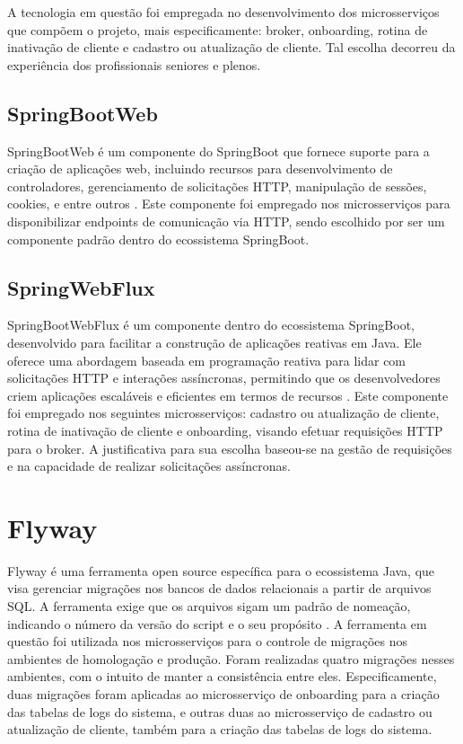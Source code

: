 A tecnologia em questão foi empregada no desenvolvimento dos microsserviços que compõem o projeto, mais especificamente: 
broker, onboarding, rotina de inativação de cliente e cadastro ou atualização de cliente. Tal escolha decorreu da 
experiência dos profissionais seniores e plenos.

\subsection{SpringBootWeb}

SpringBootWeb é um componente do SpringBoot que fornece suporte para a criação de aplicações web, incluindo 
recursos para desenvolvimento de controladores, gerenciamento de solicitações HTTP, manipulação de sessões, cookies, 
e entre outros \cite{spring:web:explicacao}. Este componente foi empregado nos microsserviços para disponibilizar 
endpoints de comunicação via HTTP, sendo escolhido por ser um componente padrão dentro do ecossistema SpringBoot.

\subsection{SpringWebFlux}

SpringBootWebFlux é um componente dentro do ecossistema SpringBoot, desenvolvido para facilitar a construção de aplicações
reativas em Java. Ele oferece uma abordagem baseada em programação reativa para lidar com solicitações HTTP e interações 
assíncronas, permitindo que os desenvolvedores criem aplicações escaláveis e eficientes em termos de recursos \cite{spring:web:flux:explicacao}. 
Este componente foi empregado nos seguintes microsserviços: cadastro ou atualização de cliente, rotina de inativação 
de cliente e onboarding, visando efetuar requisições HTTP para o broker. A justificativa para sua escolha baseou-se na 
gestão de requisições e na capacidade de realizar solicitações assíncronas.

\section{Flyway}

Flyway é uma ferramenta open source específica para o ecossistema Java, que visa gerenciar migrações nos bancos de dados 
relacionais a partir de arquivos SQL. A ferramenta exige que os arquivos sigam um padrão de nomeação, indicando o número 
da versão do script e o seu propósito \cite{flyway:explicacao}. 
A ferramenta em questão foi utilizada nos microsserviços para o controle de migrações nos ambientes de homologação e 
produção. Foram realizadas quatro migrações nesses ambientes, com o intuito de manter a consistência entre eles. 
Especificamente, duas migrações foram aplicadas ao microsserviço de onboarding para a criação das tabelas de logs do 
sistema, e outras duas ao microsserviço de cadastro ou atualização de cliente, também para a criação das tabelas de logs 
do sistema.



